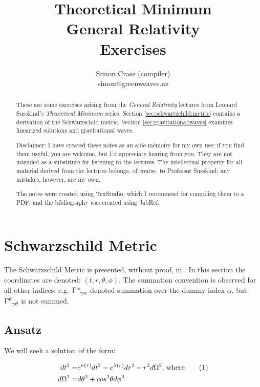 \documentclass[]{article}
\title{Theoretical Minimum\\General Relativity\\Exercises}
\author{Simon Crase (compiler)\\simon@greenweaves.nz}
\newcommand\numberthis{\addtocounter{equation}{1}\tag{\theequation}}
\begin{document}
\maketitle

\begin{abstract}
	These are some exercises arising from the \emph{General Relativity}\cite{susskind2012general} lectures from Leonard Susskind's \emph{Theoretical Minimum} series\cite{susskind2007theoretical}. Section \ref{sec:schwartzchild:metric} contains a derivation of the Schwarzschild metric. Section \ref{sec:gravitational:waves} examines linearized solutions and gravitational waves.
	
	Disclaimer: I have created these notes as an aide-m\'emoire for my own use; if you find them useful, you are welcome, but I'd appreciate hearing from you. They are not intended 
	as a substitute for listening to the lectures. The intellectual property for all material derived from the lectures belongs, of course, to Professor Susskind; any mistakes, however, are my own.
	
	The notes were created using TexStudio\cite{TexStudio}, which I recommend for compiling them to a PDF, and the bibliography was created using JabRef\cite{Jabref}.
\end{abstract}

\tableofcontents
\listoffigures
\listoftables
\listoftheorems

	
\section{Schwarzschild Metric}\label{sec:schwartzchild:metric}

The Schwarzschild Metric is presented, without proof, in \cite[Lecture 6]{susskind2012general}. In this section the coordinates are denoted: $(t,r,\theta,\phi)$. The summation convention is observed for all other indices: e.g. $\Gamma\indices{^\alpha_{\gamma\alpha}}$ denoted summation over the dummy index $\alpha$, but $\Gamma\indices{^\theta_{\gamma\theta}}$ is not summed.

\subsection{Ansatz}
We will seek a solution of the form\cite{Adler1965Introduction}:

\begin{align*}
	dt^2 =& e^{\nu(r)} dt^2 -e^{\lambda(r)} dr^2 -r^2 d \Omega^2 \text{, where} \numberthis \label{eq:schwartzschild:ansatz}\\
	d \Omega^2 =&d\theta^2 + cos^2 \theta d\phi^2 
\end{align*}
\end{document}

